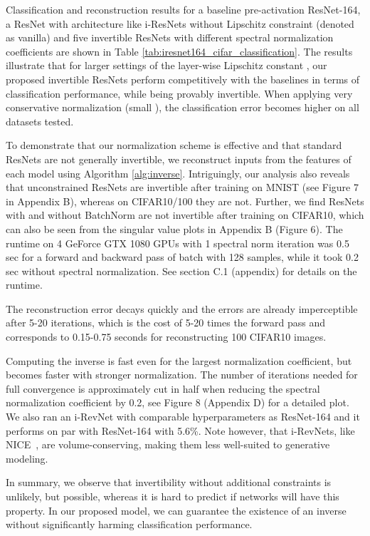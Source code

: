 \documentclass{article}
\begin{document}
Classification and reconstruction results for a baseline pre-activation ResNet-164, a ResNet with architecture like i-ResNets without Lipschitz constraint (denoted as vanilla) and five invertible ResNets with different spectral normalization coefficients are shown in Table \ref{tab:iresnet164_cifar_classification}. The results illustrate that for larger settings of the layer-wise Lipschitz constant , our proposed invertible ResNets perform competitively with the baselines in terms of classification performance, while being provably invertible. When applying very conservative normalization (small ), the classification error becomes higher on all datasets tested. 

To demonstrate that our normalization scheme is effective and that standard ResNets are not generally invertible, we reconstruct inputs from the features of each model using Algorithm \ref{alg:inverse}. Intriguingly, our analysis also reveals that unconstrained ResNets are invertible after training on MNIST (see Figure 7 in Appendix B), whereas on CIFAR10/100 they are not. Further, we find ResNets with and without BatchNorm are not invertible after training on CIFAR10, which can also be seen from the singular value plots in Appendix B (Figure 6). The runtime on 4 GeForce GTX 1080 GPUs with 1 spectral norm iteration was 0.5 sec for a forward and backward pass of batch with 128 samples, while it took 0.2 sec without spectral normalization. See section C.1 (appendix) for details on the runtime.

The reconstruction error decays quickly and the errors are already imperceptible after 5-20 iterations, which is the cost of 5-20 times the forward pass and corresponds to 0.15-0.75 seconds for reconstructing 100 CIFAR10 images.

Computing the inverse is fast even for the largest normalization coefficient, but becomes faster with stronger normalization. The number of iterations needed for full convergence is approximately cut in half when reducing the spectral normalization coefficient by 0.2, see Figure 8 (Appendix D) for a detailed plot. We also ran an i-RevNet \cite{jacobsen2018irevnet} with comparable hyperparameters as ResNet-164 and it performs on par with ResNet-164 with 5.6\%. Note however, that i-RevNets, like NICE~\cite{dinh2014nice}, are volume-conserving, making them less well-suited to generative modeling.

In summary, we observe that invertibility without additional constraints is unlikely, but possible, whereas it is hard to predict if networks will have this property. In our proposed model, we can guarantee the existence of an inverse without significantly harming classification performance.
\end{document}
